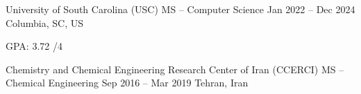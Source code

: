 {}


\begin{cventries}


\cventry
  {University of South Carolina (USC)}   %
  {MS -- Computer Science}       %
  {Jan 2022 -- Dec 2024}                      %
  {Columbia, SC, US}                                   %
  {
    \begin{cvitems}                           %
      \item {GPA: 3.72 /4}
    \end{cvitems}
  }

\vspace{0.05cm}
\cventry
  {Chemistry and Chemical Engineering Research Center of Iran (CCERCI)}
  {MS -- Chemical Engineering}
  {Sep 2016 -- Mar 2019}
  {Tehran, Iran}
  {
  }


\end{cventries}
